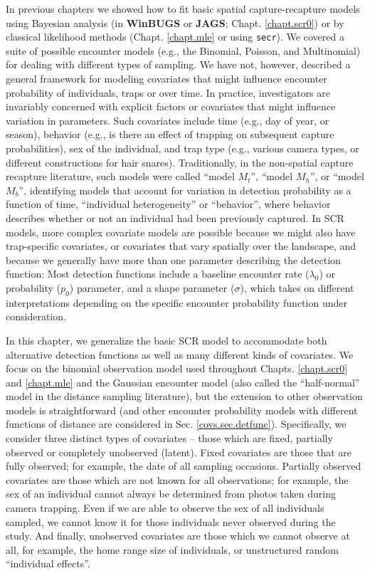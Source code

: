 In previous chapters we showed how to fit basic spatial
capture-recapture models using Bayesian analysis (in {\bf WinBUGS} or
{\bf JAGS};
Chapt. \ref{chapt.scr0}) or by classical likelihood methods
(Chapt. \ref{chapt.mle} or using \mbox{\tt secr}). We covered a suite of possible encounter models
(e.g., the Binomial, Poisson, and Multinomial) for
dealing with different types of sampling. We have not, however,
described a general framework for modeling covariates that might
influence encounter probability of individuals, traps or over time.
In practice, 
investigators are invariably concerned
with explicit factors or covariates that might influence variation in
parameters. Such covariates
include time (e.g., day of year, or season), behavior (e.g., is there an 
effect of trapping on subsequent capture probabilities), sex of the individual, and trap
type (e.g., various camera types, or different constructions for hair
snares). Traditionally, in the non-spatial capture recapture
literature, such models were called ``model $M_t$'', ``model
$M_h$'', or ``model $M_b$'', identifying models that account for
variation in detection probability as a function of time, ``individual
heterogeneity'' or ``behavior'', where behavior describes
whether or not an individual had been previously captured. In SCR
models, more complex covariate models are possible because we might
also have trap-specific covariates, or covariates that vary spatially
over the landscape, and because we generally have more than one 
parameter describing the detection function:
Most detection functions include a baseline encounter
rate ($\lambda_0$) or probability ($p_0$) parameter, and a shape parameter
($\sigma$), which takes on different interpretations depending on
the specific encounter probability function under consideration. 

In this chapter, we generalize the basic SCR model to accommodate both 
alternative detection functions as well as
many different kinds of covariates. We focus on the binomial observation
model used throughout Chapts. \ref{chapt.scr0} and \ref{chapt.mle} and
the Gaussian encounter model (also called the ``half-normal'' model in
the distance sampling literature), 
but the extension to other observation models is
straightforward (and other encounter probability models with different functions
of distance are considered in Sec. \ref{covs.sec.detfunc}). 
Specifically, we consider three distinct types of
covariates -- those which are fixed, partially observed or completely
unobserved (latent).  Fixed covariates are those that are fully
observed; for example, the date of all sampling occasions.  Partially
observed covariates are those which are not known for all
observations; for example, the sex of an individual cannot always be
determined from photos taken during camera trapping.  Even if we are
able to observe the sex of all individuals sampled, we cannot know it
for those individuals never observed during the study.  And finally,
unobserved covariates are those which we cannot observe at all, for
example, the home range size of individuals, or unstructured random
``individual effects''.


